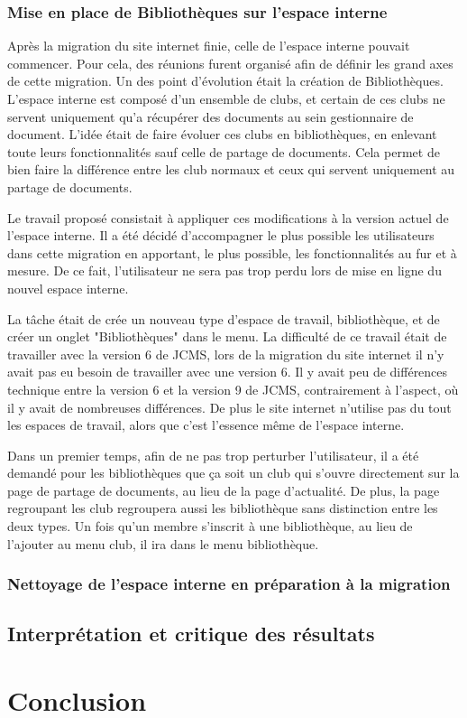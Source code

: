 \documentclass[12pt,a4paper]{article}
\begin{document}
\subsubsection{Mise en place de Bibliothèques sur l'espace interne}
Après la migration du site internet finie, celle de l'espace interne pouvait commencer. Pour cela, des réunions furent organisé afin de définir les grand axes de cette migration. Un des point d'évolution était la création de Bibliothèques. L'espace interne est composé d'un ensemble de clubs, et certain de ces clubs ne servent uniquement qu'a récupérer des documents au sein gestionnaire de document. L'idée était de faire évoluer ces clubs en bibliothèques, en enlevant toute leurs fonctionnalités sauf celle de partage de documents. Cela permet de bien faire la différence entre les club normaux et ceux qui servent uniquement au partage de documents.\par 
Le travail proposé consistait à appliquer ces modifications à la version actuel de l'espace interne. Il a été décidé d'accompagner le plus possible les utilisateurs dans cette migration en apportant, le plus possible, les fonctionnalités au fur et à mesure. De ce fait, l'utilisateur ne sera pas trop perdu lors de mise en ligne du nouvel espace interne.\par 
La tâche était de crée un nouveau type d'espace de travail, bibliothèque, et de créer un onglet "Bibliothèques" dans le menu. La difficulté de ce travail était de travailler avec la version 6 de \gls{JCMS}, lors de la migration du site internet il n'y avait pas eu besoin de travailler avec une version 6. Il y avait peu de différences technique entre la version 6 et la version 9 de \gls{JCMS}, contrairement à l'aspect, où il y avait de nombreuses différences. De plus le site internet n'utilise pas du tout les espaces de travail, alors que c'est l'essence même de l'espace interne.\par 
Dans un premier temps, afin de ne pas trop perturber l'utilisateur, il a été demandé pour les bibliothèques que ça soit un club qui s'ouvre directement sur la page de partage de documents, au lieu de la page d'actualité. De plus, la page regroupant les club regroupera aussi les bibliothèque sans distinction entre les deux types. Un fois qu'un membre s'inscrit à une bibliothèque, au lieu de l'ajouter au menu club, il ira dans le menu bibliothèque.\par

\subsubsection{Nettoyage de l'espace interne en préparation à la migration}

\subsection{Interprétation et critique des résultats}
\newpage
\section{Conclusion}
\printglossaries
\listoffigures
\end{document}
